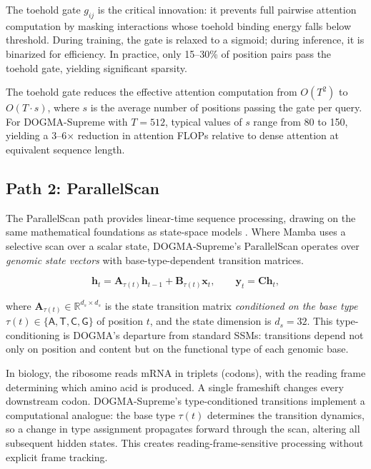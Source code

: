 The toehold gate $g_{ij}$ is the critical innovation: it prevents full pairwise attention computation by masking interactions whose toehold binding energy falls below threshold. During training, the gate is relaxed to a sigmoid; during inference, it is binarized for efficiency. In practice, only 15--30\% of position pairs pass the toehold gate, yielding significant sparsity.

\begin{implnote}
The toehold gate reduces the effective attention computation from $O(T^2)$ to $O(T \cdot s)$, where $s$ is the average number of positions passing the gate per query. For DOGMA-Supreme with $T = 512$, typical values of $s$ range from 80 to 150, yielding a 3--6$\times$ reduction in attention FLOPs relative to dense attention at equivalent sequence length.
\end{implnote}

\subsection{Path 2: ParallelScan}
\label{sec:parallel-scan-path}

The ParallelScan path provides linear-time sequence processing, drawing on the same mathematical foundations as state-space models \citep{gu2023mamba}. Where Mamba uses a selective scan over a scalar state, DOGMA-Supreme's ParallelScan operates over \emph{genomic state vectors} with base-type-dependent transition matrices.

\begin{equation}
\mathbf{h}_t = \mathbf{A}_{\tau(t)} \mathbf{h}_{t-1} + \mathbf{B}_{\tau(t)} \mathbf{x}_t, \qquad \mathbf{y}_t = \mathbf{C} \mathbf{h}_t,
\label{eq:parallel-scan}
\end{equation}

where $\mathbf{A}_{\tau(t)} \in \mathbb{R}^{d_s \times d_s}$ is the state transition matrix \emph{conditioned on the base type} $\tau(t) \in \{\mathsf{A}, \mathsf{T}, \mathsf{C}, \mathsf{G}\}$ of position $t$, and the state dimension is $d_s = 32$. This type-conditioning is DOGMA's departure from standard SSMs: transitions depend not only on position and content but on the functional type of each genomic base.

\begin{bioinsight}
In biology, the ribosome reads mRNA in triplets (codons), with the reading frame determining which amino acid is produced. A single frameshift changes every downstream codon. DOGMA-Supreme's type-conditioned transitions implement a computational analogue: the base type $\tau(t)$ determines the transition dynamics, so a change in type assignment propagates forward through the scan, altering all subsequent hidden states. This creates reading-frame-sensitive processing without explicit frame tracking.
\end{bioinsight}


